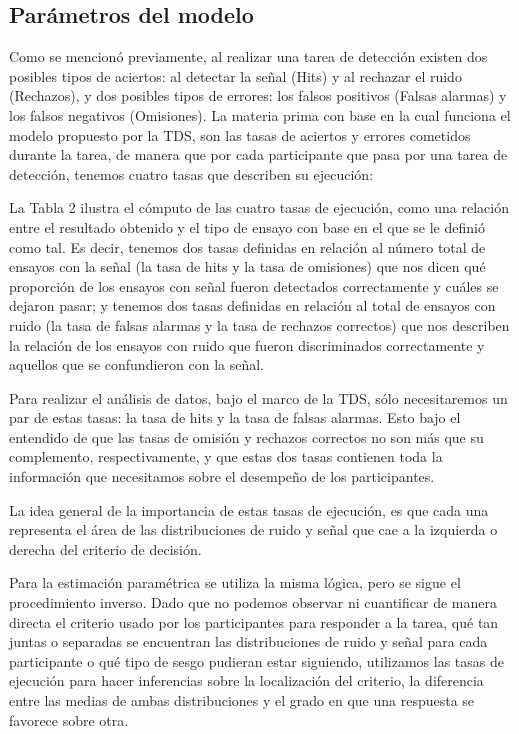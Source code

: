 \subsection{Parámetros del modelo}

Como se mencionó previamente, al realizar una tarea de detección existen dos posibles tipos de aciertos: al detectar la señal (Hits) y al rechazar el ruido (Rechazos), y dos posibles tipos de errores: los falsos positivos (Falsas alarmas) y los falsos negativos (Omisiones). La materia prima con base en la cual funciona el modelo propuesto por la TDS, son las tasas de aciertos y errores cometidos durante la tarea, de manera que por cada participante que pasa por una tarea de detección, tenemos cuatro tasas que describen su ejecución:

La Tabla 2 ilustra el cómputo de las cuatro tasas de ejecución, como una relación entre el resultado obtenido y el tipo de ensayo con base en el que se le definió como tal. Es decir, tenemos dos tasas definidas en relación al número total de ensayos con la señal (la tasa de hits y la tasa de omisiones) que nos dicen qué proporción de los ensayos con señal fueron detectados correctamente y cuáles se dejaron pasar; y tenemos dos tasas definidas en relación al total de ensayos con ruido (la tasa de falsas alarmas y la tasa de rechazos correctos) que nos describen la relación de los ensayos con ruido que fueron discriminados correctamente y aquellos que se confundieron con la señal.

Para realizar el análisis de datos, bajo el marco de la TDS, sólo necesitaremos un par de estas tasas: la tasa de hits y la tasa de falsas alarmas. Esto bajo el entendido de que las tasas de omisión y rechazos correctos no son más que su complemento, respectivamente, y que estas dos tasas contienen toda la información que necesitamos sobre el desempeño de los participantes.

La idea general de la importancia de estas tasas de ejecución, es que cada una representa el área de las distribuciones de ruido y señal que cae a la izquierda o derecha del criterio de decisión.

Para la estimación paramétrica se utiliza la misma lógica, pero se sigue el procedimiento inverso. Dado que no podemos observar ni cuantificar de manera directa el criterio usado por los participantes para responder a la tarea, qué tan juntas o separadas se encuentran las distribuciones de ruido y señal para cada participante o qué tipo de sesgo pudieran estar siguiendo, utilizamos las tasas de ejecución para hacer inferencias sobre la localización del criterio, la diferencia entre las medias de ambas distribuciones y el grado en que una respuesta se favorece sobre otra. 

